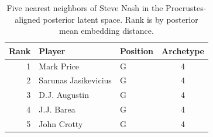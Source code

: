 \begin{table}[htbp]
  \centering\small
  \begin{tabular}{rllc}
    \toprule
    Rank & Player & Position & Archetype \\
    \midrule
    1 & Mark Price & G & 4 \\
    2 & Sarunas Jasikevicius & G & 4 \\
    3 & D.J. Augustin & G & 4 \\
    4 & J.J. Barea & G & 4 \\
    5 & John Crotty & G & 4 \\
    \bottomrule
  \end{tabular}
  \caption{Five nearest neighbors of Steve Nash in the Procrustes-aligned posterior latent space. Rank is by posterior mean embedding distance.}
  \label{tab:Steve_Nash_neighbors}
\end{table}

